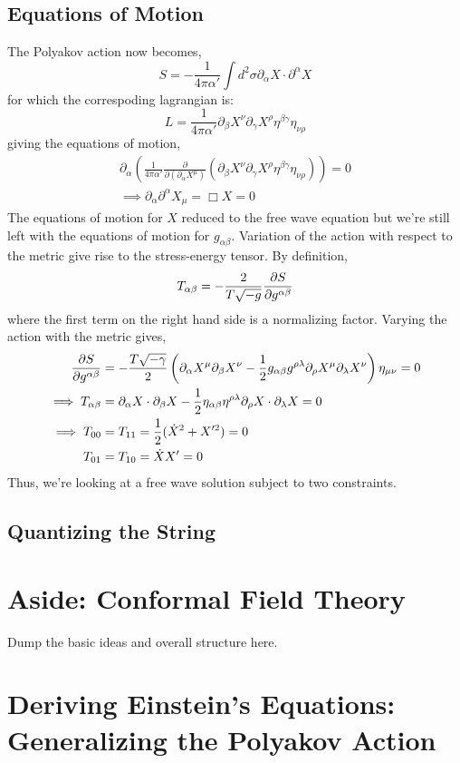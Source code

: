 \documentclass{article}
\providecommand{\brak}[1]{\ensuremath{\left(#1\right)}} %
\begin{document}
\subsection{Equations of Motion}
The Polyakov action now becomes,
\begin{equation}
	S = -\frac{1}{4\pi\alpha'}\int d^2\sigma \partial_\alpha X\cdot\partial^\alpha X
\end{equation}
for which the correspoding lagrangian is:
\begin{equation}
	L  = \frac{1}{4\pi\alpha'} \partial_\beta X^\nu\partial_\gamma X^\rho\eta^{\beta\gamma}\eta_{\nu\rho}
\end{equation}
giving the equations of motion,
\begin{align}
	\partial_\alpha\brak{\frac{1}{4\pi\alpha'}\frac{\partial}{\partial(\partial_\alpha X^\mu)}\brak{\partial_\beta X^\nu\partial_\gamma X^\rho\eta^{\beta\gamma}\eta_{\nu\rho}}} = 0\\
	\implies \partial_\alpha\partial^\alpha X_\mu = \Box X=0
\end{align}
The equations of motion for $X$ reduced to the free wave equation but we're still left with the equations of motion for $g_{\alpha\beta}$. Variation of the action with respect to the metric give rise to the stress-energy tensor. By definition,
\begin{equation}
	T_{\alpha\beta}  =- \frac{2}{T\sqrt{-g}} \pdv{S}{g^{\alpha\beta}}
\end{equation}
where the first term on the right hand side is a normalizing factor. Varying the action with the metric gives,
\begin{align}
	\pdv{S}{g^{\alpha\beta}} &= -\frac{T\sqrt{-\gamma}}{2}\brak{\partial_\alpha X^\mu\partial_\beta X^\nu-\frac{1}{2}g_{\alpha\beta}g^{\rho\lambda}\partial_\rho X^\mu\partial_\lambda X^\nu}\eta_{\mu\nu}=0\\
	\implies T_{\alpha\beta} &= \partial_\alpha X\cdot\partial_\beta X -\frac{1}{2}\eta_{\alpha\beta}\eta^{\rho\lambda}\partial_\rho X\cdot\partial_\lambda X=0\\
	\implies T_{00} &= T_{11} = \frac{1}{2}(\dot{X}^2+X'^2) = 0\nonumber\\
	T_{01}&=T_{10} = \dot{X}X'=0
\end{align}
Thus, we're looking at a free wave solution subject to two constraints.
\subsection{Quantizing the String}
\section{Aside: Conformal Field Theory}
Dump the basic ideas and overall structure here.


\section{Deriving Einstein's Equations: Generalizing the Polyakov Action}

\end{document}
